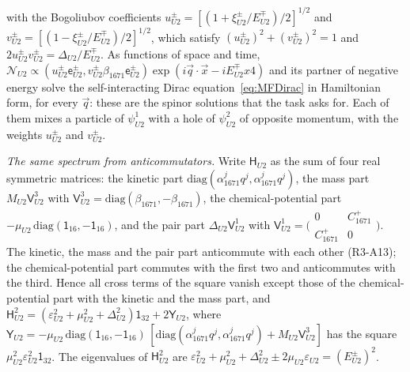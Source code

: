 with the Bogoliubov coefficients $u^\pm_{U2}=[(1+\xi^\pm_{U2}/E^\mp_{U2})/2]^{1/2}$ and
$v^\pm_{U2}=[(1-\xi^\pm_{U2}/E^\mp_{U2})/2]^{1/2}$, which satisfy
$(u^\pm_{U2})^2+(v^\pm_{U2})^2=1$ and $2u^\pm_{U2}v^\pm_{U2}=\Delta_{U2}/E^\mp_{U2}$. As functions
of space and time, $\mathcal N_{U2}\propto(u^\pm_{U2}\mathsf e^\pm_{U2},v^\pm_{U2}\beta_{1671}\mathsf
e^\pm_{U2})\exp(i\vec q\cdot\vec x-iE^\mp_{U2}x4)$ and its partner of negative energy solve the
self-interacting Dirac equation~\eqref{eq:MFDirac} in Hamiltonian form, for every $\vec q$: these
are the spinor solutions that the task asks for. Each of them mixes a particle of $\psi^1_{U2}$
with a hole of $\psi^2_{U2}$ of opposite momentum, with the weights $u^\pm_{U2}$ and $v^\pm_{U2}$.

\emph{The same spectrum from anticommutators.} Write $\mathsf H_{U2}$ as the sum of four real
symmetric matrices: the kinetic part $\mathrm{diag}(\alpha^j_{1671}q^j,\alpha^j_{1671}q^j)$, the mass
part $M_{U2}\mathsf V^3_{U2}$ with $\mathsf V^3_{U2}=\mathrm{diag}(\beta_{1671},-\beta_{1671})$, the
chemical-potential part $-\mu_{U2}\,\mathrm{diag}(\mathsf 1_{16},-\mathsf 1_{16})$, and the pair part
$\Delta_{U2}\mathsf V^1_{U2}$ with $\mathsf V^1_{U2}=\big(\begin{smallmatrix}0&C^+_{1671}\\
C^+_{1671}&0\end{smallmatrix}\big)$. The kinetic, the mass and the pair part anticommute with each
other (R3-A13); the chemical-potential part commutes with the first two and anticommutes with the
third. Hence all cross terms of the square vanish except those of the chemical-potential part
with the kinetic and the mass part, and
$\mathsf H_{U2}^2=(\varepsilon_{U2}^2+\mu_{U2}^2+\Delta_{U2}^2)\mathsf 1_{32}+2\mathsf Y_{U2}$, where
$\mathsf Y_{U2}=-\mu_{U2}\,\mathrm{diag}(\mathsf 1_{16},-\mathsf 1_{16})\,[\mathrm{diag}(\alpha^j_{1671}q^j,\alpha^j_{1671}q^j)+M_{U2}\mathsf V^3_{U2}]$
has the square $\mu^2_{U2}\varepsilon^2_{U2}\mathsf 1_{32}$. The eigenvalues of $\mathsf H^2_{U2}$ are
$\varepsilon^2_{U2}+\mu^2_{U2}+\Delta^2_{U2}\pm2\mu_{U2}\varepsilon_{U2}=(E^\pm_{U2})^2$.

